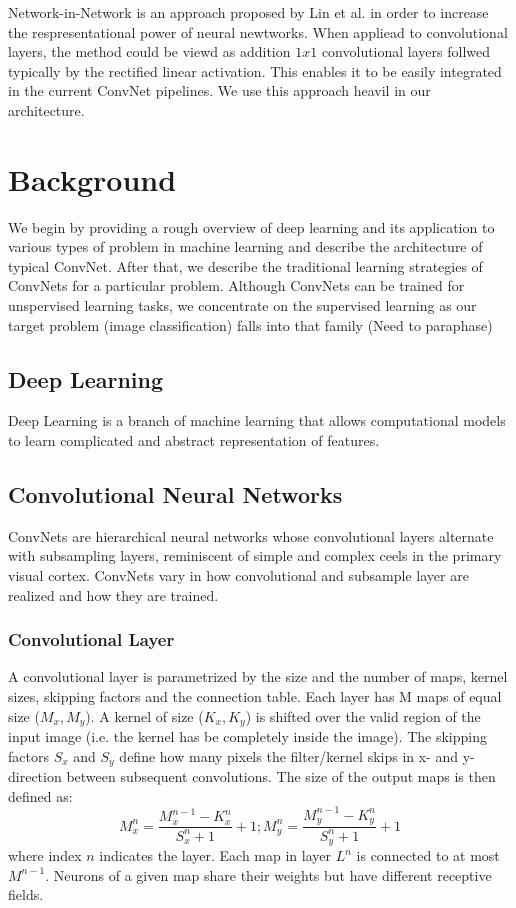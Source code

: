 \documentclass{sig-alternate}
\begin{document}
Network-in-Network is an approach proposed by Lin et al. in order to increase the respresentational power of neural newtworks. When appliead to convolutional layers, the method could be viewd as addition $1x1$ convolutional layers follwed typically by the rectified linear activation. This enables it to be easily integrated in the current ConvNet pipelines. We use this approach heavil in our architecture.

\section{Background}
We begin by providing a rough overview of deep learning and its application to various types of problem in machine learning and describe the architecture of typical ConvNet. After that, we describe the traditional learning strategies of ConvNets for a particular problem. Although ConvNets can be trained for unspervised learning tasks, we concentrate on the supervised learning as our target problem (image classification) falls into that family (Need to paraphase)
\subsection{Deep Learning}
Deep Learning is a branch of machine learning that allows computational models to learn complicated and abstract representation of features.
\subsection{Convolutional Neural Networks}
ConvNets are hierarchical neural networks whose convolutional layers alternate with subsampling layers, reminiscent of simple and complex ceels in the primary visual cortex. ConvNets vary in how convolutional and subsample layer are realized and how they are trained.
       \subsubsection{Convolutional Layer}
       A convolutional layer is parametrized by the size and the number of maps, kernel sizes, skipping factors and the connection table. Each layer has M maps of equal size ($M_x, M_y$). A kernel of size ($K_x, K_y$) is shifted over the valid region of the input image (i.e. the kernel has be completely inside the image). The skipping factors $S_x$ and $S_y$ define how many pixels the filter/kernel skips in x- and y-direction between subsequent convolutions. The size of the output maps is then defined as:
       \begin{equation}
              M^n_x=\frac{M^{n-1}_x - K^n_x}{S^n_x + 1}+1; M^n_y=\frac{M^{n-1}_y - K^n_y}{S^n_y + 1}+1
       \end{equation}
       where index $n$ indicates the layer. Each map in layer $L^n$ is connected to at most $M^{n-1}$. Neurons of a given map share their weights but have different receptive fields.
\end{document}
